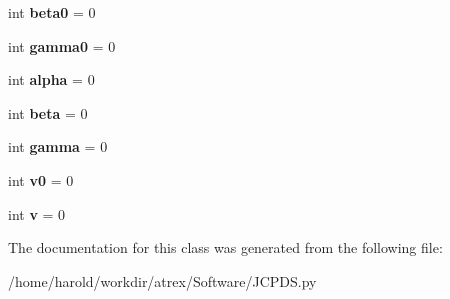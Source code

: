 \begin{DoxyCompactItemize}
\item 
\hypertarget{classJCPDS_1_1JCPDS_a28cdaa7d634aa5683e2b9b3f5f0d32e7}{int {\bfseries beta0} = 0}\label{classJCPDS_1_1JCPDS_a28cdaa7d634aa5683e2b9b3f5f0d32e7}

\item 
\hypertarget{classJCPDS_1_1JCPDS_a64bff5a1dafc26de47247bd07b858774}{int {\bfseries gamma0} = 0}\label{classJCPDS_1_1JCPDS_a64bff5a1dafc26de47247bd07b858774}

\item 
\hypertarget{classJCPDS_1_1JCPDS_af4550ef102f3c38e2da9fe2e29b2c95b}{int {\bfseries alpha} = 0}\label{classJCPDS_1_1JCPDS_af4550ef102f3c38e2da9fe2e29b2c95b}

\item 
\hypertarget{classJCPDS_1_1JCPDS_aa5dde75830b82228fb5424b31f1d5ec2}{int {\bfseries beta} = 0}\label{classJCPDS_1_1JCPDS_aa5dde75830b82228fb5424b31f1d5ec2}

\item 
\hypertarget{classJCPDS_1_1JCPDS_a5400cdc3eb14af0cf773e9bc83a9817c}{int {\bfseries gamma} = 0}\label{classJCPDS_1_1JCPDS_a5400cdc3eb14af0cf773e9bc83a9817c}

\item 
\hypertarget{classJCPDS_1_1JCPDS_aaef6e23360b1e68d8cfdcad1c60fb88f}{int {\bfseries v0} = 0}\label{classJCPDS_1_1JCPDS_aaef6e23360b1e68d8cfdcad1c60fb88f}

\item 
\hypertarget{classJCPDS_1_1JCPDS_aba3d9f6fdf4c176b7263d5657b602aaa}{int {\bfseries v} = 0}\label{classJCPDS_1_1JCPDS_aba3d9f6fdf4c176b7263d5657b602aaa}

\end{DoxyCompactItemize}


The documentation for this class was generated from the following file\-:\begin{DoxyCompactItemize}
\item 
/home/harold/workdir/atrex/\-Software/J\-C\-P\-D\-S.\-py\end{DoxyCompactItemize}
